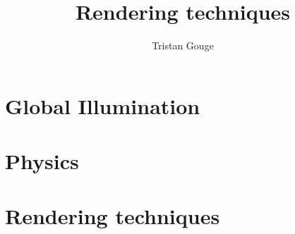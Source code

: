 \documentclass[a4paper,12pt]{scrbook}
\begin{document}
\title{Rendering techniques}
\author{Tristan Gouge}
\date{}
\maketitle

\frontmatter
\tableofcontents

\mainmatter

\chapter{Global Illumination}
\label{ch:global_illumination}


\chapter{Physics}
\label{ch:physics}


\chapter{Rendering techniques}
\label{ch:Rendering_techniques}


\backmatter

\printbibliography
\end{document}
